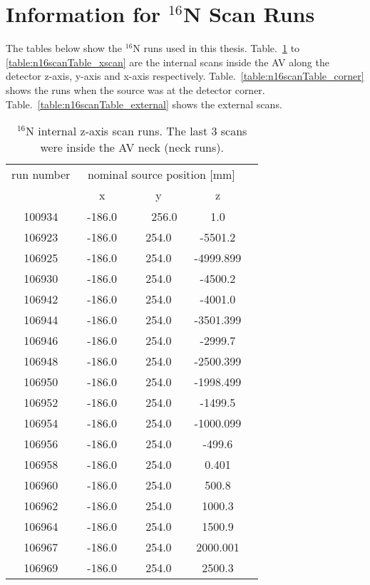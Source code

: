 \section{Information for $^{16}$N Scan Runs}\label{appendix:calibration}
The tables below show the $^{16}$N runs used in this thesis. Table.~\ref{table:n16scanTable_zscan} to \ref{table:n16scanTable_xscan} are the internal scans inside the AV along the detector z-axis, y-axis and x-axis respectively. Table.~\ref{table:n16scanTable_corner} shows the runs when the source was at the detector corner. Table.~\ref{table:n16scanTable_external} shows the external scans.
\begin{table}[ht]
		\caption[]{$^{16}$N internal z-axis scan runs. The last 3 scans were inside the AV neck (neck runs).}
		\label{table:n16scanTable_zscan}
			\centering
	\begin{tabular*}{90mm}{c@{\extracolsep{\fill}}*4c}
		\toprule 
		run number  & \multicolumn{3}{c}{nominal source position [mm]}  \\
                                \cline{2-4}
			& x & y & z\\
		\midrule
        100934 &-186.0　&　256.0　& 1.0\\
        106923 &-186.0 & 254.0 &-5501.2\\
        106925 &-186.0 & 254.0 &-4999.899\\
        106930 &-186.0 & 254.0 & -4500.2\\
        106942 &-186.0 & 254.0 & -4001.0\\
        106944 &-186.0 & 254.0 & -3501.399\\
        106946 &-186.0 & 254.0 & -2999.7\\
        106948 &-186.0 & 254.0 & -2500.399\\
        106950 &-186.0 & 254.0 & -1998.499\\
        106952 &-186.0 & 254.0 & -1499.5\\
        106954 &-186.0 & 254.0 & -1000.099\\
        106956 &-186.0 & 254.0 & -499.6\\
        106958 &-186.0 & 254.0 & 0.401 \\
        106960 &-186.0 & 254.0 & 500.8\\
        106962 &-186.0 & 254.0 & 1000.3\\
        106964 &-186.0 & 254.0 & 1500.9\\
        106967 &-186.0 & 254.0 & 2000.001\\
        106969 &-186.0 & 254.0 & 2500.3\\

\end{tabular*}
\end{table}
